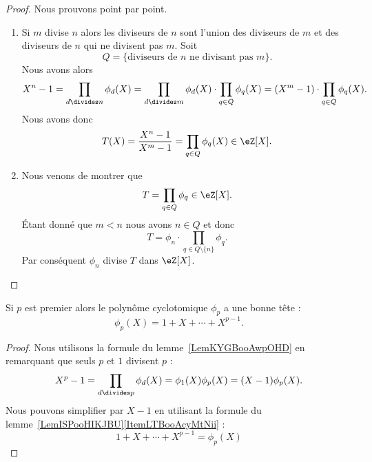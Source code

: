 \begin{proof}
	Nous prouvons point par point.
	\begin{enumerate}
		\item
		      Si \( m\) divise \( n\) alors les diviseurs de \( n\) sont l'union des diviseurs de \( m\) et des diviseurs de \( n\) qui ne divisent pas \( m\). Soit
		      \begin{equation}
			      Q=\{\text{diviseurs de } n\text{ ne divisant pas } m \}.
		      \end{equation}
		      Nous avons alors
		      \begin{equation}
			      X^n-1=\prod_{d\divides n}\phi_d(X)=\prod_{d\divides m}\phi_d(X)\cdot\prod_{q\in Q}\phi_q(X)=(X^m-1)\cdot\prod_{q\in Q}\phi_q(X).
		      \end{equation}
		      Nous avons donc
		      \begin{equation}
			      T(X)=\frac{ X^n-1 }{ X^m-1 }=\prod_{q\in Q}\phi_q(X)\in \eZ[X].
		      \end{equation}

		\item
		      Nous venons de montrer que
		      \begin{equation}
			      T=\prod_{q\in Q}\phi_q\in \eZ[X].
		      \end{equation}
		      Étant donné que \( m<n\) nous avons \( n\in Q\) et donc
		      \begin{equation}
			      T=\phi_n\cdot\prod_{q\in Q\setminus\{ n \}}\phi_q.
		      \end{equation}
		      Par conséquent \( \phi_n\) divise \( T\) dans \( \eZ[X]\).
	\end{enumerate}
\end{proof}

\begin{corollary}   \label{CorTVUooErJiAC}
	Si \( p\) est premier alors le polynôme cyclotomique \( \phi_p\) a une bonne tête :
	\begin{equation}
		\phi_p(X)=1+X+\cdots +X^{p-1}.
	\end{equation}
\end{corollary}

\begin{proof}
	Nous utilisons la formule du lemme~\ref{LemKYGBooAwpOHD} en remarquant que seuls \( p\) et \( 1\) divisent \( p\) :
	\begin{equation}
		X^p-1=\prod_{d\divides p}\phi_d(X)=\phi_1(X)\phi_p(X)=(X-1)\phi_p(X).
	\end{equation}
	Nous pouvons simplifier par \( X-1\) en utilisant la formule du lemme~\ref{LemISPooHIKJBU}\ref{ItemLTBooAcyMtNii} :
	\begin{equation}
		1+X+\cdots +X^{p-1}=\phi_p(X)
	\end{equation}
\end{proof}

